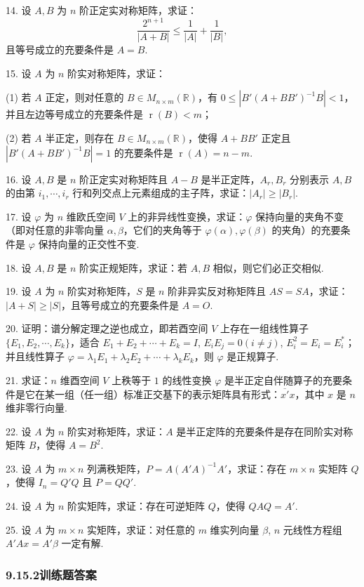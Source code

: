 \documentclass[UTF8, 12pt, fontset=fandol, oneside]{ctexart}
\begin{document}
14. 设 $A,B$ 为 $n$ 阶正定实对称矩阵，求证：
\[
\frac{2^{n+1}}{|A+B|}\le \frac{1}{|A|}+\frac{1}{|B|},
\]
且等号成立的充要条件是 $A=B$.

15. 设 $A$ 为 $n$ 阶实对称矩阵，求证：

(1) 若 $A$ 正定，则对任意的 $B\in M_{n\times m}(\mathbb{R})$，有 $0\le |B'(A+BB')^{-1}B|<1$，并且左边等号成立的充要条件是 $\operatorname{r}(B)<m$；

(2) 若 $A$ 半正定，则存在 $B\in M_{n\times m}(\mathbb{R})$，使得 $A+BB'$ 正定且 $|B'(A+BB')^{-1}B|=1$ 的充要条件是 $\operatorname{r}(A)=n-m$.

16. 设 $A,B$ 是 $n$ 阶正定实对称矩阵且 $A-B$ 是半正定阵，$A_r,B_r$ 分别表示 $A,B$ 的由第 $i_1,\cdots,i_r$ 行和列交点上元素组成的主子阵，求证：$|A_r|\ge |B_r|$.

17. 设 $\varphi$ 为 $n$ 维欧氏空间 $V$ 上的非异线性变换，求证：$\varphi$ 保持向量的夹角不变（即对任意的非零向量 $\alpha,\beta$，它们的夹角等于 $\varphi(\alpha),\varphi(\beta)$ 的夹角）的充要条件是 $\varphi$ 保持向量的正交性不变.

18. 设 $A,B$ 是 $n$ 阶实正规矩阵，求证：若 $A,B$ 相似，则它们必正交相似.

19. 设 $A$ 为 $n$ 阶实对称矩阵，$S$ 是 $n$ 阶非异实反对称矩阵且 $AS=SA$，求证：$|A+S|\ge |S|$，且等号成立的充要条件是 $A=O$.

20. 证明：谱分解定理之逆也成立，即若酉空间 $V$ 上存在一组线性算子 $\{E_1,E_2,\cdots,E_k\}$，适合 $E_1+E_2+\cdots+E_k=I$, $E_iE_j=0(i\ne j)$, $E_i^2=E_i=E_i^*$；并且线性算子 $\varphi=\lambda_1E_1+\lambda_2E_2+\cdots+\lambda_kE_k$，则 $\varphi$ 是正规算子.

21. 求证：$n$ 维酉空间 $V$ 上秩等于 $1$ 的线性变换 $\varphi$ 是半正定自伴随算子的充要条件是它在某一组（任一组）标准正交基下的表示矩阵具有形式：$\overline{x'}x$，其中 $x$ 是 $n$ 维非零行向量.

22. 设 $A$ 为 $n$ 阶实对称矩阵，求证：$A$ 是半正定阵的充要条件是存在同阶实对称矩阵 $B$，使得 $A=B^2$.

23. 设 $A$ 为 $m\times n$ 列满秩矩阵，$P=A(A'A)^{-1}A'$，求证：存在 $m\times n$ 实矩阵 $Q$，使得 $I_n=Q'Q$ 且 $P=QQ'$.

24. 设 $A$ 为 $n$ 阶实矩阵，求证：存在可逆矩阵 $Q$，使得 $QAQ=A'$.

25. 设 $A$ 为 $m\times n$ 实矩阵，求证：对任意的 $m$ 维实列向量 $\beta$, $n$ 元线性方程组 $A'Ax=A'\beta$ 一定有解.

\subsubsection*{9.15.2\quad 训练题答案}
\end{document}
